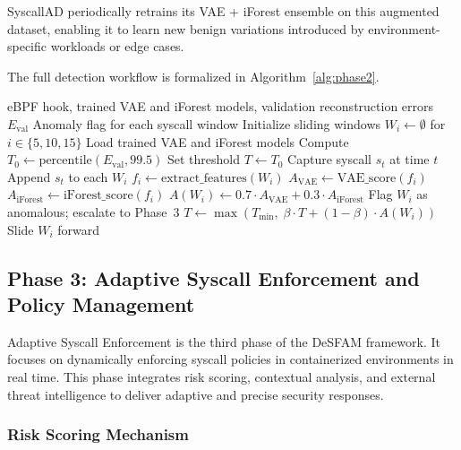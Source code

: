 SyscallAD periodically retrains its VAE + iForest ensemble on this augmented dataset, enabling
it to learn new benign variations introduced by environment-specific workloads or edge cases.

The full detection workflow is formalized in Algorithm~\ref{alg:phase2}.

\begin{algorithm}[htbp]
\caption{Real-Time Syscall Anomaly Detection (SyscallAD)}
\label{alg:phase2}
\begin{algorithmic}[1]
  \Require eBPF hook, trained VAE and iForest models,
           validation reconstruction errors $E_{\text{val}}$
  \Ensure Anomaly flag for each syscall window
  \State Initialize sliding windows $W_i \leftarrow \emptyset$ for $i \in \{5, 10, 15\}$
  \State Load trained VAE and iForest models
  \State Compute $T_0 \leftarrow \text{percentile}(E_{\text{val}}, 99.5)$
  \State Set threshold $T \leftarrow T_0$
    \State Capture syscall $s_t$ at time $t$
    \State Append $s_t$ to each $W_i$
      \State $f_i \leftarrow \text{extract\_features}(W_i)$
      \State $A_{\text{VAE}} \leftarrow \text{VAE\_score}(f_i)$
      \State $A_{\text{iForest}} \leftarrow \text{iForest\_score}(f_i)$
      \State $A(W_i) \leftarrow 0.7 \cdot A_{\text{VAE}} + 0.3 \cdot A_{\text{iForest}}$
        \State Flag $W_i$ as anomalous; escalate to Phase~3
      \Else
        \State $T \leftarrow \max(T_{\min},\; \beta \cdot T + (1 - \beta) \cdot A(W_i))$
      \EndIf
      \State Slide $W_i$ forward
    \EndFor
  \EndWhile
\end{algorithmic}
\end{algorithm}

\subsection{Phase 3: Adaptive Syscall Enforcement and Policy Management}
\label{subsec:phase3}

Adaptive Syscall Enforcement is the third phase of the DeSFAM framework. It focuses on
dynamically enforcing syscall policies in containerized environments in real time. This phase
integrates risk scoring, contextual analysis, and external threat intelligence to deliver
adaptive and precise security responses.

\subsubsection{Risk Scoring Mechanism}
\label{subsubsec:risk_scoring}


